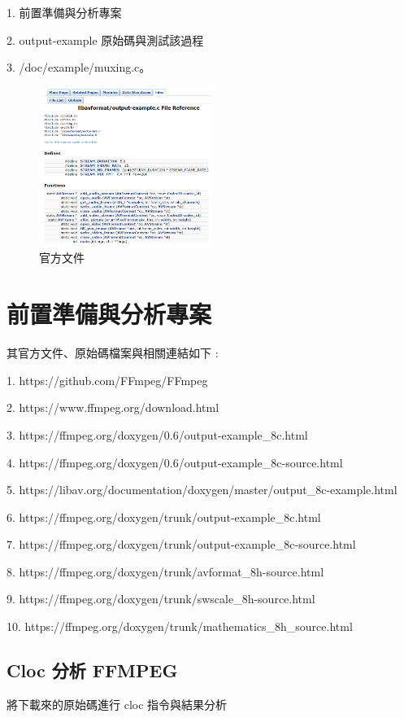 \documentclass[10pt,UTF8]{ctexart}
\begin{document}
1. 前置準備與分析專案

2. output-example 原始碼與測試該過程

3. /doc/example/muxing.c。

\begin{figure}[H]
\centering 
\includegraphics[width=0.50\textwidth]{f1.png} 
\caption{官方文件}
\label{Test}
\end{figure}

\section{前置準備與分析專案}

其官方文件、原始碼檔案與相關連結如下 :

1. https://github.com/FFmpeg/FFmpeg

2. https://www.ffmpeg.org/download.html

3. https://ffmpeg.org/doxygen/0.6/output-example\_8c.html

4. https://ffmpeg.org/doxygen/0.6/output-example\_8c-source.html

5. https://libav.org/documentation/doxygen/master/output\_8c-example.html

6. https://ffmpeg.org/doxygen/trunk/output-example\_8c.html

7. https://ffmpeg.org/doxygen/trunk/output-example\_8c-source.html

8. https://ffmpeg.org/doxygen/trunk/avformat\_8h-source.html

9. https://ffmpeg.org/doxygen/trunk/swscale\_8h-source.html

10. https://ffmpeg.org/doxygen/trunk/mathematics\_8h\_source.html

\subsection{Cloc 分析 FFMPEG}

將下載來的原始碼進行 cloc 指令與結果分析
\end{document}
